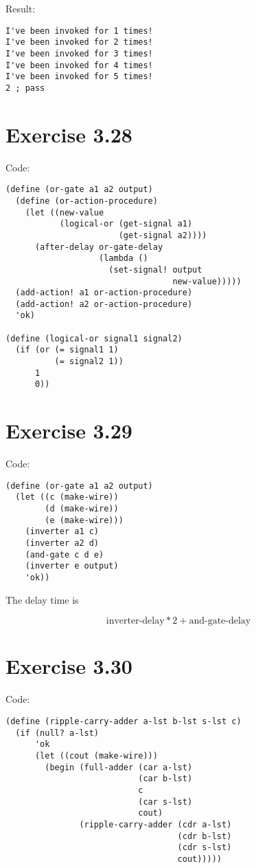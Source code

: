 \documentclass[../main.tex]{subfiles}
\begin{document}
Result:

\begin{lstlisting}
I've been invoked for 1 times!
I've been invoked for 2 times!
I've been invoked for 3 times!
I've been invoked for 4 times!
I've been invoked for 5 times!
2 ; pass
\end{lstlisting}

\section{Exercise 3.28}

Code:

\begin{lstlisting}
(define (or-gate a1 a2 output)
  (define (or-action-procedure)
    (let ((new-value
           (logical-or (get-signal a1)
                       (get-signal a2))))
      (after-delay or-gate-delay
                   (lambda ()
                     (set-signal! output
                                  new-value)))))
  (add-action! a1 or-action-procedure)
  (add-action! a2 or-action-procedure)
  'ok)

(define (logical-or signal1 signal2)
  (if (or (= signal1 1)
          (= signal2 1))
      1
      0))
\end{lstlisting}

\section{Exercise 3.29}

Code:

\begin{lstlisting}
(define (or-gate a1 a2 output)
  (let ((c (make-wire))
        (d (make-wire))
        (e (make-wire)))
    (inverter a1 c)
    (inverter a2 d)
    (and-gate c d e)
    (inverter e output)
    'ok))
\end{lstlisting}

The delay time is

$$
\text{inverter-delay} * 2 + \text{and-gate-delay}
$$

\section{Exercise 3.30}

Code:

\begin{lstlisting}
(define (ripple-carry-adder a-lst b-lst s-lst c)
  (if (null? a-lst)
      'ok
      (let ((cout (make-wire)))
        (begin (full-adder (car a-lst)
                           (car b-lst)
                           c
                           (car s-lst)
                           cout)
               (ripple-carry-adder (cdr a-lst)
                                   (cdr b-lst)
                                   (cdr s-lst)
                                   cout)))))
\end{lstlisting}
\end{document}
